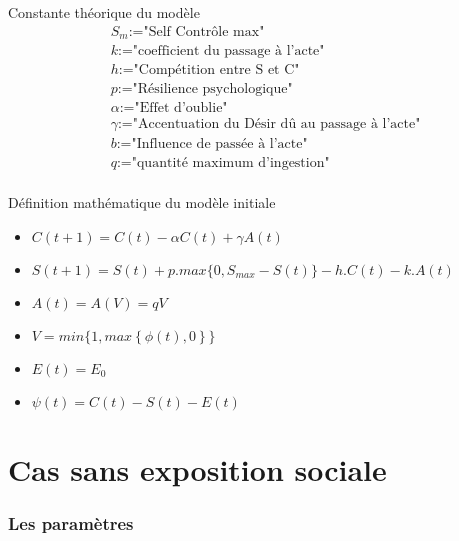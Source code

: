 \documentclass{beamer}
\begin{document}
\begin{frame}
	\begin{block}{Constante théorique du modèle}
		\begin{align*}
			&S_m\text{:="Self Contrôle max"} \\
			&k\text{:="coefficient du passage à l'acte"} \\
			&h\text{:="Compétition entre S et C"} \\
			&p\text{:="Résilience psychologique"} \\
			&\alpha\text{:="Effet d'oublie"} \\
			&\gamma \text{:="Accentuation du Désir dû au passage à l'acte"} \\
			&b\text{:="Influence de passée à l'acte"} \\
			&q\text{:="quantité maximum d'ingestion"} \\
		\end{align*}
	\end{block}
\end{frame}


\begin{frame}
	\begin{block}{Définition mathématique du modèle initiale}
		\begin{itemize}
			\item<1-> $C(t+1) = C(t)- \alpha C(t) + \gamma A(t)$
			\item<2-> $S(t+1)=S(t)+p.max\{0,S_{max}-S(t)\}-h.C(t)-k.A(t)$
			\item<3-> $A(t)=A(V)=qV$
			\item<4->$V= min\{1,max\left\lbrace \phi(t),0 \right\rbrace \}$
			\item<5->$E(t)=E_0$
			\item<6->$\psi(t)=C(t)-S(t)-E(t)$
		\end{itemize}
	\end{block}
\end{frame}


\section{Cas sans exposition sociale }

\begin{frame}
	\frametitle{Les paramètres}
\end{frame}
\end{document}
